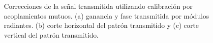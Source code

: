 \begin{figure}[H]
	\centering

	\caption{Correcciones de la señal transmitida utilizando calibración por acoplamientos mutuos. (a) ganancia y fase transmitida por módulos
		radiantes. (b) corte horizontal del patrón transmitido y (c) corte vertical del patrón transmitido.}
	\label{fig:nonErrMutual0deg}
\end{figure}

